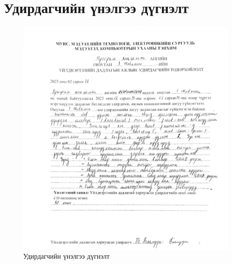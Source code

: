 \appendix
{}

\chapter{Удирдагчийн үнэлгээ дүгнэлт}
\begin{figure}[h]
   \centering
   \includegraphics[scale=0.23]{src/images/todorhoilolt.jpeg}
   \caption{Удирдагчийн үнэлгээ дүгнэлт}
\end{figure}

